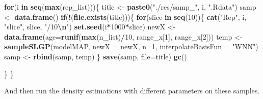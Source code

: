 \documentclass[
]{article}
\newenvironment{Shaded}{\begin{snugshade}}{\end{snugshade}}
\newcommand{\AttributeTok}[1]{\textcolor[rgb]{0.13,0.29,0.53}{#1}}
\newcommand{\ControlFlowTok}[1]{\textcolor[rgb]{0.13,0.29,0.53}{\textbf{#1}}}
\newcommand{\DecValTok}[1]{\textcolor[rgb]{0.00,0.00,0.81}{#1}}
\newcommand{\FunctionTok}[1]{\textcolor[rgb]{0.13,0.29,0.53}{\textbf{#1}}}
\newcommand{\NormalTok}[1]{#1}
\newcommand{\OtherTok}[1]{\textcolor[rgb]{0.56,0.35,0.01}{#1}}
\newcommand{\SpecialCharTok}[1]{\textcolor[rgb]{0.81,0.36,0.00}{\textbf{#1}}}
\newcommand{\StringTok}[1]{\textcolor[rgb]{0.31,0.60,0.02}{#1}}
\begin{document}
\begin{Shaded}
\begin{Highlighting}[]
\ControlFlowTok{for}\NormalTok{(i }\ControlFlowTok{in} \FunctionTok{seq}\NormalTok{(}\FunctionTok{max}\NormalTok{(rep\_list)))\{}
\NormalTok{  title }\OtherTok{\textless{}{-}} \FunctionTok{paste0}\NormalTok{(}\StringTok{"./res/samp\_"}\NormalTok{, i, }\StringTok{".Rdata"}\NormalTok{)}
\NormalTok{  samp }\OtherTok{\textless{}{-}} \FunctionTok{data.frame}\NormalTok{()}
  \ControlFlowTok{if}\NormalTok{(}\SpecialCharTok{!}\NormalTok{(}\FunctionTok{file.exists}\NormalTok{(title)))\{}
    \ControlFlowTok{for}\NormalTok{(slice }\ControlFlowTok{in} \FunctionTok{seq}\NormalTok{(}\DecValTok{10}\NormalTok{))\{  }
      \FunctionTok{cat}\NormalTok{(}\StringTok{"Rep"}\NormalTok{, i, }\StringTok{"slice"}\NormalTok{, slice, }\StringTok{"/10}\SpecialCharTok{\textbackslash{}n}\StringTok{"}\NormalTok{)}
      \FunctionTok{set.seed}\NormalTok{(i}\SpecialCharTok{*}\DecValTok{1000}\SpecialCharTok{*}\NormalTok{slice)}
\NormalTok{      newX }\OtherTok{\textless{}{-}} \FunctionTok{data.frame}\NormalTok{(}\AttributeTok{age=}\FunctionTok{runif}\NormalTok{(}\FunctionTok{max}\NormalTok{(n\_list)}\SpecialCharTok{/}\DecValTok{10}\NormalTok{, range\_x[}\DecValTok{1}\NormalTok{], range\_x[}\DecValTok{2}\NormalTok{]))}
\NormalTok{      temp }\OtherTok{\textless{}{-}} \FunctionTok{sampleSLGP}\NormalTok{(modelMAP, }
                         \AttributeTok{newX =}\NormalTok{ newX, }
                         \AttributeTok{n=}\DecValTok{1}\NormalTok{, }
                         \AttributeTok{interpolateBasisFun =} \StringTok{"WNN"}\NormalTok{)}
\NormalTok{      samp }\OtherTok{\textless{}{-}} \FunctionTok{rbind}\NormalTok{(samp, temp)}
\NormalTok{    \}}
    \FunctionTok{save}\NormalTok{(samp, }\AttributeTok{file=}\NormalTok{title)}
    \FunctionTok{gc}\NormalTok{()}
    
    
\NormalTok{  \}}
\NormalTok{\}}
\end{Highlighting}
\end{Shaded}

And then run the density estimations with different parameters on these samples.
\end{document}
